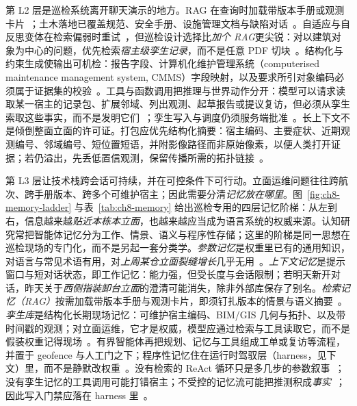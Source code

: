 第 L2 层是巡检系统离开聊天演示的地方。RAG 在查询时加载带版本手册或观测卡片~\cite{lewis2020,shuster2021}；土木落地已覆盖规范、安全手册、设施管理文档与缺陷对话~\cite{joffe2025buildingcodes,lee2024ragsafety,krutli2025fmrags,jeon2025hybridrag,he2025regulationhybrid}。自适应与自反思变体在检索偏弱时重试~\cite{gao2023hyde,asai2024selfrag,jeong2024adaptive}，但巡检设计选择比\emph{加个 RAG}更尖锐：对以建筑对象为中心的问题，优先检索\emph{宿主级孪生记录}，而不是任意 PDF 切块~\cite{peng2024}。结构化与约束生成使输出可机检：报告字段、计算机化维护管理系统（computerised maintenance management system, CMMS）字段映射，以及要求所引对象编码必须属于证据集的校验~\cite{pan2024b,chen2024bimllmontology,iversen2026,buga2025llmfmsql}。工具与函数调用把推理与世界动作分开：模型可以请求读取某一宿主的记录包、扩展邻域、列出观测、起草报告或提议复访，但必须从孪生索取这些事实，而不是发明它们~\cite{schick2023toolformer,yao2023react,guo2025bimllmquery,liu2025bimcoder,li2025b,li2025c}；孪生写入与调度仍须服务端批准~\cite{luo2025llmdtrobot,gao2026ifcagent}。长上下文不是倾倒整面立面的许可证。打包应优先结构化摘要：宿主编码、主要症状、近期观测编号、邻域编号、短位置短语，并附影像路径而非原始像素，以便人类打开证据；若仍溢出，先丢低置信观测，保留传播所需的拓扑链接~\cite{lewis2020,asai2024selfrag}。

第 L3 层让技术栈跨会话可持续，并在可控条件下可行动。立面运维问题往往跨航次、跨手册版本、跨多个可维护宿主；因此需要分清\emph{记忆放在哪里}。图~\ref{fig:ch8-memory-ladder} 与表~\ref{tab:ch8-memory} 给出巡检专用的四层记忆阶梯：从左到右，信息越来越\emph{贴近本栋本立面}，也越来越应当成为语言系统的权威来源。认知研究常把智能体记忆分为工作、情景、语义与程序性存储；这里的阶梯是同一思想在巡检现场的专门化，而不是另起一套分类学。\emph{参数记忆}是权重里已有的通用知识，对语言与常见术语有用，对\emph{上周某仓立面裂缝增长}几乎无用~\cite{brown2020}。\emph{上下文记忆}是提示窗口与短对话状态，即工作记忆：能力强，但受长度与会话限制；若明天新开对话，昨天关于\emph{西侧指装卸台立面}的澄清可能消失，除非外部库保存了别名。\emph{检索记忆（RAG）}按需加载带版本手册与观测卡片，即须钉扎版本的情景与语义摘要~\cite{lewis2020,shuster2021,krutli2025fmrags}。\emph{孪生库}是结构化长期现场记忆：可维护宿主编码、BIM/GIS 几何与拓扑、以及带时间戳的观测；对立面运维，它才是权威，模型应通过检索与工具读取它，而不是假装权重记得现场~\cite{pan2024b,zhang2025}。有界智能体再把规划、记忆与工具组成工单或复访等流程，并置于 geofence 与人工门之下；程序性记忆住在运行时驾驭层（harness，见下文）里，而不是静默改权重~\cite{wang2024surveyagents,li2024surveymultiagent,rawat2025llmmas,pan2026graphdtgpt,zhang2025llmagentschema}。没有检索的 ReAct 循环只是多几步的参数叙事~\cite{yao2023react}；没有孪生记忆的工具调用可能打错宿主；不受控的记忆流可能把推测积成\emph{事实}~\cite{park2023generativeagents}；因此写入门禁应落在 harness 里~\cite{luo2025llmdtrobot,gao2026ifcagent}。

